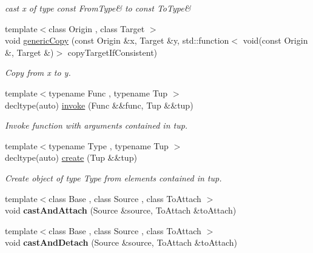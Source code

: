 \begin{DoxyCompactItemize}
\begin{DoxyCompactList}\small\item\em cast x of type \textquotesingle{}const From\+Type\&\textquotesingle{} to \textquotesingle{}const To\+Type\&\textquotesingle{} \end{DoxyCompactList}\item 
{\footnotesize template$<$class Origin , class Target $>$ }\\void \hyperlink{namespaceSpacy_a7dd8ce352c45e326cf8966befd5159ce}{generic\+Copy} (const Origin \&x, Target \&y, std\+::function$<$ void(const Origin \&, Target \&)$>$ copy\+Target\+If\+Consistent)
\begin{DoxyCompactList}\small\item\em Copy from x to y. \end{DoxyCompactList}\item 
{\footnotesize template$<$typename Func , typename Tup $>$ }\\decltype(auto) \hyperlink{namespaceSpacy_a64250818ba7ff711c207af6ab40ff986}{invoke} (Func \&\&func, Tup \&\&tup)
\begin{DoxyCompactList}\small\item\em Invoke function with arguments contained in tup. \end{DoxyCompactList}\item 
{\footnotesize template$<$typename Type , typename Tup $>$ }\\decltype(auto) \hyperlink{namespaceSpacy_ae823c82326475d3cc3b166533deddf21}{create} (Tup \&\&tup)
\begin{DoxyCompactList}\small\item\em Create object of type Type from elements contained in tup. \end{DoxyCompactList}\item 
\hypertarget{namespaceSpacy_accc9a8a0cad11b10fb4453e6bea7a7e1}{}{\footnotesize template$<$class Base , class Source , class To\+Attach $>$ }\\void {\bfseries cast\+And\+Attach} (Source \&source, To\+Attach \&to\+Attach)\label{namespaceSpacy_accc9a8a0cad11b10fb4453e6bea7a7e1}

\item 
\hypertarget{namespaceSpacy_a9e6018674d6169a33a2fa75a35e2fef3}{}{\footnotesize template$<$class Base , class Source , class To\+Attach $>$ }\\void {\bfseries cast\+And\+Detach} (Source \&source, To\+Attach \&to\+Attach)\label{namespaceSpacy_a9e6018674d6169a33a2fa75a35e2fef3}


\end{DoxyCompactItemize}
